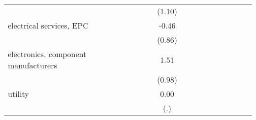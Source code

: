 \begin{table}[htbp]
\begin{tabular*}{0.8\hsize}{@{\hskip\tabcolsep\extracolsep\fill}l*{16}{c}}
                    &                     &                     &                     &                     &                     &                     &      (1.10)         &                     &                     &                     &                     &                     &                     &                     &                     &                     \\
[1em]
electrical services, EPC&                     &                     &                     &                     &                     &                     &       -0.46         &                     &                     &                     &                     &                     &                     &                     &                     &                     \\
                    &                     &                     &                     &                     &                     &                     &      (0.86)         &                     &                     &                     &                     &                     &                     &                     &                     &                     \\
[1em]
electronics, component manufacturers&                     &                     &                     &                     &                     &                     &        1.51         &                     &                     &                     &                     &                     &                     &                     &                     &                     \\
                    &                     &                     &                     &                     &                     &                     &      (0.98)         &                     &                     &                     &                     &                     &                     &                     &                     &                     \\
[1em]
utility             &                     &                     &                     &                     &                     &                     &        0.00         &                     &                     &                     &                     &                     &                     &                     &                     &                     \\
                    &                     &                     &                     &                     &                     &                     &         (.)         &                     &                     &                     &                     &                     &                     &                     &                     &                     \\

\end{tabular*}
\end{table}
